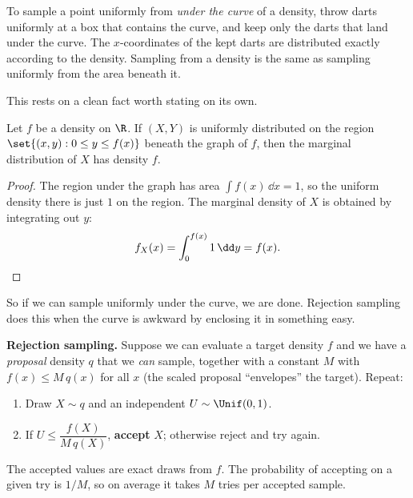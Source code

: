 \begin{intuitionbox}
To sample a point uniformly from \emph{under the curve} of a density, throw darts
uniformly at a box that contains the curve, and keep only the darts that land
under the curve. The $x$-coordinates of the kept darts are distributed exactly
according to the density. Sampling from a density is the same as sampling
uniformly from the area beneath it.
\end{intuitionbox}

This rests on a clean fact worth stating on its own.

\begin{theorem}
\label{ch35:thm-fts}
Let $f$ be a density on $\R$. If $(X, Y)$ is uniformly distributed on the region
$\set{(x,y) : 0 \le y \le f(x)}$ beneath the graph of $f$, then the marginal
distribution of $X$ has density $f$.
\end{theorem}

\begin{proof}
The region under the graph has area $\int f(x)\,\dd x = 1$, so the uniform
density there is just $1$ on the region. The marginal density of $X$ is obtained
by integrating out $y$:
\[
  f_X(x) = \int_0^{f(x)} 1 \, \dd y = f(x). \qedhere
\]
\end{proof}

So if we can sample uniformly under the curve, we are done. Rejection sampling
does this when the curve is awkward by enclosing it in something easy.

\begin{formalbox}
\textbf{Rejection sampling.} Suppose we can evaluate a target density $f$ and we
have a \emph{proposal} density $q$ that we \emph{can} sample, together with a
constant $M$ with $f(x) \le M\,q(x)$ for all $x$ (the scaled proposal
``envelopes'' the target). Repeat:
\begin{enumerate}
  \item Draw $X \sim q$ and an independent $U \sim \Unif(0,1)$.
  \item If $U \le \dfrac{f(X)}{M\,q(X)}$, \textbf{accept} $X$; otherwise reject and
        try again.
\end{enumerate}
The accepted values are exact draws from $f$. The probability of accepting on a
given try is $1/M$, so on average it takes $M$ tries per accepted sample.
\end{formalbox}


